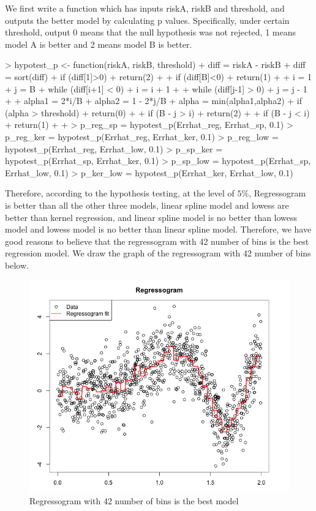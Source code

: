 \documentclass[12pt]{article}
\begin{document}
We first write a function which has inputs riskA, riskB and threshold, and outputs the better model by calculating p values. Specifically, under certain threshold, output 0 means that the null hypothesis was not rejected, 1 means model A is better and 2 means model B is better.
\begin{Schunk}
\begin{Sinput}
> hypotest_p <- function(riskA, riskB, threshold){
+   diff = riskA - riskB
+   diff = sort(diff)
+   if (diff[1]>0){
+     return(2)
+   }
+   if (diff[B]<0){
+     return(1)
+   }
+   i = 1
+   j = B
+   while (diff[i+1] < 0){
+     i = i + 1
+   }
+   while (diff[j-1] > 0){
+     j = j - 1
+   }
+   alpha1 = 2*i/B
+   alpha2 = 1 - 2*j/B
+   alpha = min(alpha1,alpha2)
+   if (alpha > threshold){
+     return(0)
+   }
+   if (B - j > i){
+     return(2)
+   }
+   if (B - j < i){
+     return(1)
+   }
+ }
> p_reg_sp = hypotest_p(Errhat_reg, Errhat_sp, 0.1)
> p_reg_ker = hypotest_p(Errhat_reg, Errhat_ker, 0.1)
> p_reg_low = hypotest_p(Errhat_reg, Errhat_low, 0.1)
> p_sp_ker = hypotest_p(Errhat_sp, Errhat_ker, 0.1)
> p_sp_low = hypotest_p(Errhat_sp, Errhat_low, 0.1)
> p_ker_low = hypotest_p(Errhat_ker, Errhat_low, 0.1)
\end{Sinput}
\end{Schunk}
Therefore, according to the hypothesis testing, at the level of $5\%$, Regressogram is better than all the other three models, linear spline model and lowess are better than kernel regression, and linear spline model is no better than lowess model and lowess model is no better than linear spline model. Therefore, we have good reasons to believe that the regressogram with 42 number of bins is the best regression model. We draw the graph of the regressogram with 42 number of bins below.
\begin{figure}
\begin{center}
\caption{Regressogram with 42 number of bins is the best model}
\includegraphics[scale=0.50]{optimal regressogram}
\end{center}
\end{figure}
\end{document}

